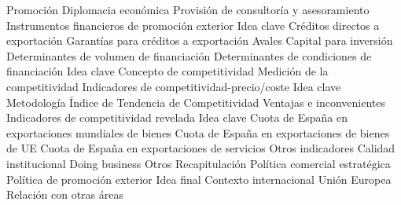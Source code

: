 \documentclass{nuevotema}
\begin{document}
\begin{esquema}[enumerate]
			\3 Promoción
			\3 Diplomacia económica
			\3 Provisión de consultoría y asesoramiento
		\2 Instrumentos financieros de promoción exterior
			\3 Idea clave
			\3 Créditos directos a exportación
			\3 Garantías para créditos a exportación
			\3 Avales
			\3 Capital para inversión
			\3 Determinantes de volumen de financiación
			\3 Determinantes de condiciones de financiación
	\1 
		\2 Idea clave
			\3 Concepto de competitividad
			\3 Medición de la competitividad
		\2 Indicadores de competitividad-precio/coste
			\3 Idea clave
			\3 Metodología
			\3 Índice de Tendencia de Competitividad
			\3 Ventajas e inconvenientes
		\2 Indicadores de competitividad revelada
			\3 Idea clave
			\3 Cuota de España en exportaciones mundiales de bienes
			\3 Cuota de España en exportaciones de bienes de UE
			\3 Cuota de España en exportaciones de servicios
		\2 Otros indicadores
			\3 Calidad institucional
			\3 Doing business
			\3 Otros
	\1[] 
		\2 Recapitulación
			\3 Política comercial estratégica
			\3 Política de promoción exterior
		\2 Idea final
			\3 Contexto internacional
			\3 Unión Europea
			\3 Relación con otras áreas

\end{esquema}

\esquemalargo
\end{document}
